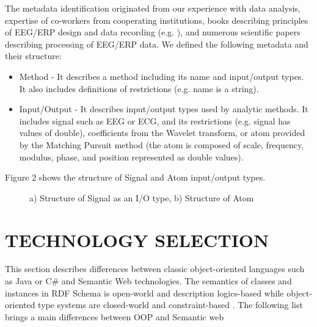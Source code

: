 \documentclass[a4paper,twoside]{article}
\begin{document}
The metadata identification originated from our experience with data analysis, expertise of co-workers from cooperating institutions, books describing principles of EEG/ERP design and data recording (e.g. \cite{Luck05}), and numerous scientific papers describing processing of EEG/ERP data. We defined the following metadata and their structure:
\begin{itemize}
	\item Method - It describes a method including its name and input/output types. It also includes definitions of restrictions (e.g. name is a string).
	
	\item Input/Output - It describes input/output types used by analytic methods. It includes signal such as EEG or ECG, and its restrictions (e.g. signal has values of double), coefficients from the Wavelet transform, or atom provided by the Matching Pursuit method (the atom is composed of scale, frequency, modulus, phase, and position represented as double values).
	
\end{itemize}

Figure 2 shows the structure of Signal and Atom input/output types.

\begin{figure}[!h]

  \centering
   {}
  \caption{a) Structure of Signal as an I/O type, b) Structure of Atom }
  \label{fig:SignalAndAtom}
 \end{figure}

\section{\uppercase{Technology Selection}}

\noindent This section describes differences between classic object-oriented languages such as Java or C\# and Semantic Web technologies. The semantics of classes and instances in RDF Schema is open-world and description logics-based while object-oriented type systems are closed-world and constraint-based \cite{Kalyanpur02}. The following list brings a main differences between OOP and Semantic web \cite{Oren07}
\end{document}
